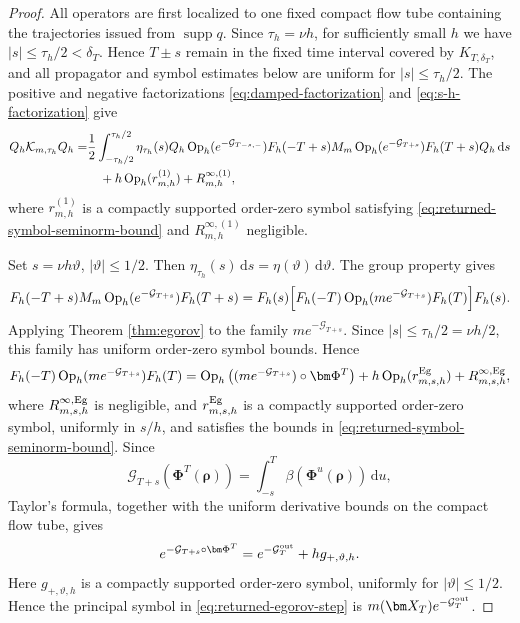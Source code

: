 \documentclass[11pt,reqno]{amsart}
\newcommand{\dd}{\,\mathrm{d}}
\newcommand{\Op}{\operatorname{Op}}
\newcommand{\supp}{\operatorname{supp}}
\numberwithin{equation}{section}
\begin{document}
\begin{proof}
All operators are first localized to one fixed compact flow tube containing the trajectories issued from $\supp q$. Since $\tau_h=\nu h$, for sufficiently small $h$ we have $|s|\leq \tau_h/2 < \delta_T$. Hence $T\pm s$ remain in the fixed time interval covered by $K_{T,\delta_T}$, and all propagator and symbol estimates below are uniform for $|s|\leq \tau_h/2$. The positive and negative factorizations \eqref{eq:damped-factorization} and \eqref{eq:s-h-factorization} give
\begin{align}
Q_h\mathcal K_{m,\tau_h}Q_h=&\frac12\int_{-\tau_h/2}^{\tau_h/2}\eta_{\tau_h}(s)Q_h\Op_h(e^{-\mathcal G_{T-s,-}})F_h(-T+s)M_m\Op_h(e^{-\mathcal G_{T+s}})F_h(T+s)Q_h\dd s\notag\\
&\quad+h\Op_h(r_{m,h}^{(1)})+R_{m,h}^{\infty,(1)},
\label{eq:returned-main-integral}
\end{align}
where $r_{m,h}^{(1)}$ is a compactly supported order-zero symbol satisfying \eqref{eq:returned-symbol-seminorm-bound} and $R_{m,h}^{\infty,(1)}$ negligible.

Set $s=\nu h\vartheta$, $|\vartheta|\le1/2$. Then $\eta_{\tau_h}(s)\dd s=\eta(\vartheta)\dd\vartheta$. The group property gives
\begin{equation*}
F_h(-T+s)M_m\Op_h(e^{-\mathcal G_{T+s}})F_h(T+s)=F_h(s)\Bigl[F_h(-T)\Op_h(me^{-\mathcal G_{T+s}})F_h(T)\Bigr]F_h(s).
\end{equation*}
Applying Theorem \ref{thm:egorov} to the family $me^{-\mathcal G_{T+s}}$. Since $|s|\leq\tau_h/2=\nu h/2$, this family has uniform order-zero symbol bounds. Hence
\begin{equation}\label{eq:returned-egorov-step}
 F_h(-T)\Op_h(me^{-\mathcal G_{T+s}})F_h(T) = \Op_h\left((me^{-\mathcal G_{T+s}})\circ\bm\Phi^T\right)+h\Op_h(r_{m,s,h}^{\rm Eg})+R_{m,s,h}^{\infty,\rm Eg},
\end{equation}
where $R_{m,s,h}^{\infty,\rm Eg}$ is negligible, and $r_{m,s,h}^{\rm Eg}$ is a compactly supported order-zero symbol, uniformly in $s/h$, and satisfies the bounds in \eqref{eq:returned-symbol-seminorm-bound}. 
Since
\begin{equation*}
 \mathcal G_{T+s}(\bm\Phi^T(\bm\rho))=\int_{-s}^{T}\beta(\bm\Phi^u(\bm\rho))\dd u,
\end{equation*}
Taylor's formula, together with the uniform derivative bounds on the compact flow tube, gives
\begin{equation*}
 e^{-\mathcal G_{T+s}\circ\bm\Phi^T}=e^{-\mathcal G_T^{\rm out}}+h g_{+,\vartheta,h}.
\end{equation*}
Here $g_{+,\vartheta,h}$ is a compactly supported order-zero symbol, uniformly for $|\vartheta|\le1/2$. Hence the principal symbol in \eqref{eq:returned-egorov-step} is
$m(\bm X_T)e^{-\mathcal G_T^{\rm out}}$.


\end{proof}
\end{document}
